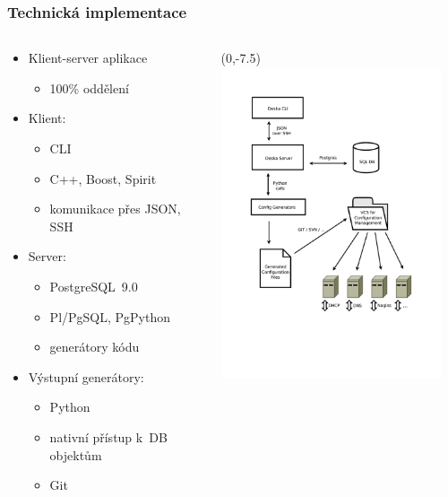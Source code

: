 \documentclass{beamer}
\begin{document}
\begin{frame}[fragile]
\frametitle{Technická implementace}
\begin{columns}
\begin{column}{.45\paperwidth}
    \begin{itemize}
        \item Klient-server aplikace
            \begin{itemize}
                \item 100\% oddělení
            \end{itemize}
        \item Klient:
            \begin{itemize}
                \item CLI
                \item C++, Boost, Spirit
                \item komunikace přes JSON, SSH
            \end{itemize}
        \item Server:
            \begin{itemize}
                \item PostgreSQL~9.0
                \item Pl/PgSQL, PgPython
                \item generátory kódu
            \end{itemize}
        \item Výstupní generátory:
            \begin{itemize}
                \item Python
                \item nativní přístup k~DB objektům
                \item Git
            \end{itemize}
    \end{itemize}
\end{column}
\begin{column}{.55\paperwidth}
\begin{textblock}{50}(0,-7.5)
\includegraphics[width=65mm, trim=28mm 64mm 28mm 27mm, clip=true]{../../technical/img-deska-components.pdf}
\end{textblock}
\end{column}
\end{columns}
\end{frame}
\end{document}
